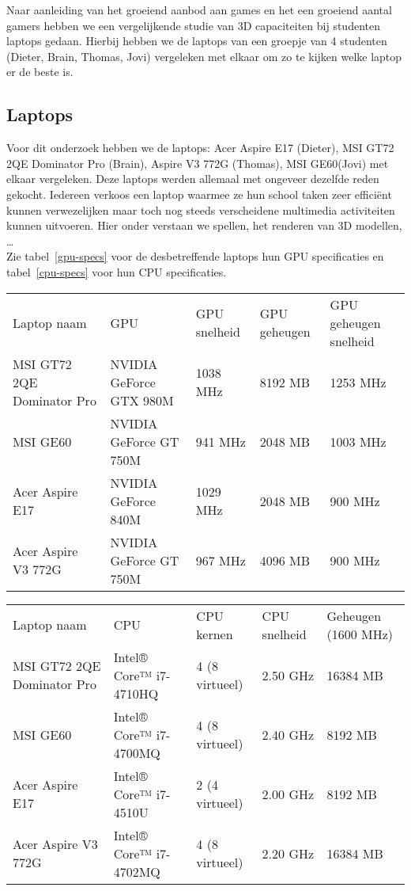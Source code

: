 Naar aanleiding van het groeiend aanbod aan games en het een groeiend aantal gamers hebben we een vergelijkende studie van 3D capaciteiten bij studenten laptops gedaan. Hierbij hebben we de laptops van een groepje van 4 studenten (Dieter, Brain, Thomas, Jovi) vergeleken met elkaar om zo te kijken welke laptop er de beste is. 
\subsection{Laptops}
Voor dit onderzoek hebben we de laptops: Acer Aspire E17 (Dieter), MSI GT72 2QE Dominator Pro (Brain), Aspire V3 772G (Thomas), MSI GE60(Jovi) met elkaar vergeleken. Deze laptops werden allemaal met ongeveer dezelfde reden gekocht. Iedereen verkoos een laptop waarmee ze hun school taken zeer effici{\"e}nt kunnen verwezelijken maar toch nog steeds verscheidene multimedia activiteiten kunnen uitvoeren. Hier onder verstaan we spellen, het renderen van 3D modellen, \dots \\
Zie tabel~\ref{gpu-specs} voor de desbetreffende laptops hun GPU specificaties en tabel~\ref{cpu-specs} voor hun CPU specificaties.
\begin{table*}[t]
\centering
\caption{GPU specificaties}
\label{gpu-specs}
\begin{tabular}{lllll}
Laptop naam                & GPU                     & GPU snelheid & GPU geheugen & GPU geheugen snelheid \\
MSI GT72 2QE Dominator Pro & NVIDIA GeForce GTX 980M & 1038 MHz  & 8192 MB    & 1253 MHz         \\
MSI GE60                   & NVIDIA GeForce GT 750M  & 941 MHz   & 2048 MB    & 1003 MHz          \\
Acer Aspire E17            & NVIDIA GeForce 840M     & 1029 MHz  & 2048 MB    & 900 MHz          \\
Acer Aspire V3 772G             & NVIDIA GeForce GT 750M  & 967 MHz   & 4096 MB    & 900 MHz         
\end{tabular}
\end{table*}
\begin{table*}[t]
\centering
\caption{CPU \& Geheugen specificaties}
\label{cpu-specs}
\begin{tabular}{lllll}
Laptop naam				   & CPU                    & CPU kernen     & CPU snelheid	& Geheugen (1600 MHz)  \\
MSI GT72 2QE Dominator Pro & Intel® Core™ i7-4710HQ & 4 (8 virtueel) & 2.50 GHz	& 16384 MB	\\
MSI GE60                   & Intel® Core™ i7-4700MQ & 4 (8 virtueel) & 2.40 GHz	& 8192 MB	\\
Acer Aspire E17            & Intel® Core™ i7-4510U  & 2 (4 virtueel) & 2.00 GHz	& 8192 MB	\\
Acer Aspire V3 772G             & Intel® Core™ i7-4702MQ & 4 (8 virtueel) & 2.20 GHz	& 16384 MB 
\end{tabular}
\end{table*}